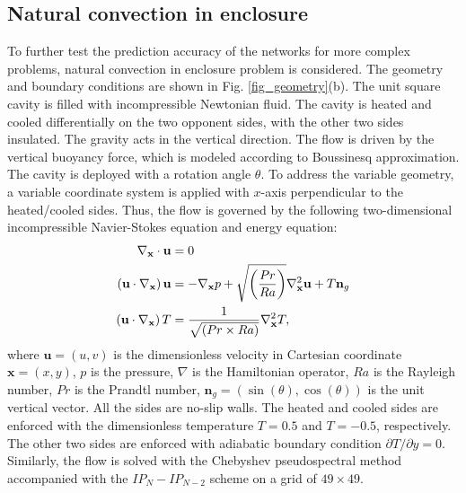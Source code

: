 \documentclass[preprint, 10pt]{elsarticle}
\begin{document}
\subsection{Natural convection in enclosure}
To further test the prediction accuracy of the networks for more complex problems, natural convection in enclosure problem is considered. The geometry and boundary conditions are shown in Fig. \ref{fig_geometry}(b). The unit square cavity is filled with incompressible Newtonian fluid. The cavity is heated and cooled differentially on the two opponent sides, with the other two sides insulated. The gravity acts in the vertical direction. The flow is driven by the vertical buoyancy force, which is modeled according to Boussinesq approximation. The cavity is deployed with a rotation angle $\theta$. To address the variable geometry, a variable coordinate system is applied with $x$-axis perpendicular to the heated/cooled sides.
Thus, the flow is governed by the following two-dimensional incompressible Navier-Stokes equation and energy equation:
\begin{equation}
\begin{aligned}
\nabla_{\mathbf{x}}  \cdot {\bf{u}} &= 0 \\
\left( {{\bf{u}} \cdot \nabla_{\mathbf{x}} } \right){\bf{u}} &=  - \nabla_{\mathbf{x}} p + \sqrt{\left(\frac{Pr}{Ra}\right)}{\nabla_{\mathbf{x}} ^2}{\bf{u}} + T\mathbf{n}_g \\
\left( {{\bf{u}} \cdot \nabla_{\mathbf{x}} } \right)T        &=  \frac{1}{\sqrt{\left({Pr}\times{Ra}\right)}}{\nabla_{\mathbf{x}} ^2}T,
\end{aligned}
\label{eq_GoverningEqsNaturalConvection}
\end{equation}
where $\mathbf{u}=(u,v)$ is the dimensionless velocity in Cartesian coordinate $\mathbf{x}=(x,y)$, $p$ is the pressure, $\nabla$ is the  Hamiltonian operator, $Ra$ is the Rayleigh number, $Pr$ is the Prandtl number, $\mathbf{n}_g=\left(\sin(\theta),\cos(\theta) \right)$ is the unit vertical vector. All the sides are no-slip walls. The heated and cooled sides are enforced with the dimensionless temperature $T=0.5$ and $T=-0.5$, respectively. The other two sides are enforced with adiabatic boundary condition $\partial T / \partial y=0$.
Similarly, the flow is solved with the Chebyshev pseudospectral method accompanied with the $IP_{N}-IP_{N-2}$ scheme on a grid of $49 \times 49$.
\end{document}
